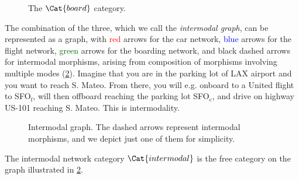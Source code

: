 \begin{example}
    \begin{figure}[h!]
        \begin{center}
        \end{center}
        \caption{The $\Cat{board}$ category. \label{fig:boarding}}
    \end{figure}

    The combination of the three, which we call the \emph{intermodal graph}, can be represented as a graph, with \textcolor{red}{red} arrows for the car network, \textcolor{blue}{blue} arrows for the flight network, \textcolor{darkgreen}{green} arrows for the boarding network, and black dashed arrows for intermodal morphisms, arising from composition of morphisms involving multiple modes (\cref{fig:intermodal}). Imagine that you are in the parking lot of \textsf{LAX} airport and you want to reach \textsf{S. Mateo}. From there, you will e.g. onboard to a \textsf{United} flight to \textsf{SFO}$_\mathrm{f}$, will then offboard reaching the parking lot \textsf{SFO}$_\mathrm{c}$, and drive on highway \textsf{US-101} reaching \textsf{S. Mateo}. This is intermodality.

    \begin{figure}[h!]
        \begin{center}
            {}
        \end{center}
        \caption{Intermodal graph. The dashed arrows represent intermodal morphisms, and we depict just one of them for simplicity. \label{fig:intermodal}
        }
    \end{figure}
\end{example}

The intermodal network category $\Cat{intermodal}$ is the free category on the graph illustrated in \cref{fig:intermodal}.

